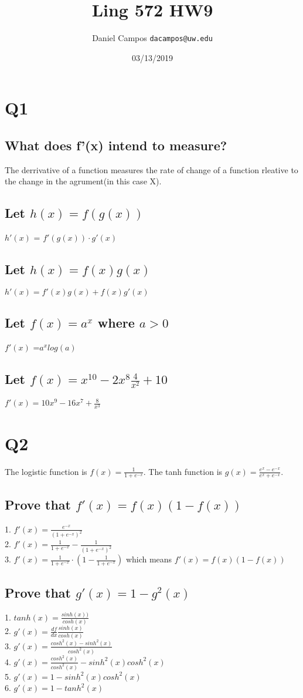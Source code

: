 \documentclass[11pt]{article}
\begin{document}
\title{Ling 572 HW9}
\author{Daniel Campos  \tt {dacampos@uw.edu}}
\date{03/13/2019}
\maketitle 
\section{Q1}
\subsection{What does f'(x) intend to measure?}
The derrivative of a function measures the rate of change of a function rleative to the change in the agrument(in this case X).
\subsection{Let $h(x)=f(g(x))$ }
$h'(x)$ = $f'(g(x)) \cdot g'(x)$
\subsection{Let $h(x)=f(x)g(x)$ }
$h'(x) = f'(x)g(x) + f(x)g'(x)$
\subsection{Let $f(x)=a^x$ where $a>0$}
$ f'(x)$ =$ a^x log(a)$
\subsection{Let $f(x)= x^{10}-2x^8  \frac{4}{x^2} + 10$}
$f'(x) =10x^{9}-16x^7 + \frac{8}{x^3}$
\section{Q2}
The logistic function is $f(x)=\frac{1}{1+e^{-x}}$. The tanh function is $g(x)=\frac{e^x - e^{-x}}{e^x +e^{-x}}$.
\subsection{Prove that $f'(x)= f(x)(1-f(x))$}
1. $f'(x) = \frac{e^{-x}}{(1+e^{-x})^2}$ \\
2. $f'(x) =  \frac{1}{1+e^{-x}}-\frac{1}{(1+e^{-x})^2}$ \\
3. $f'(x) = \frac{1}{1+e^{-x}} \cdot (1-\frac{1}{1+e^{-x}})$  which means  $f'(x)= f(x)(1-f(x))$\\
\subsection{Prove that $g'(x)=1 - g^2(x)$}
1. $tanh(x) = \frac {sinh(x))}{cosh(x)}$ \\
2. $g'(x) = \frac{df}{dx} \frac{sinh(x)}{cosh(x)}$\\
3. $g'(x) = \frac{cosh^2(x) - sinh^2(x)}{cosh^2(x)}$\\
4. $g'(x) = \frac{cosh^2(x)}{cosh^2(x)} - {sinh^2(x)}{cosh^2(x)}$\\
5. $g'(x) = 1- {sinh^2(x)}{cosh^2(x)} $\\
6. $g'(x) = 1-tanh^2(x)$\\
\end{document}

